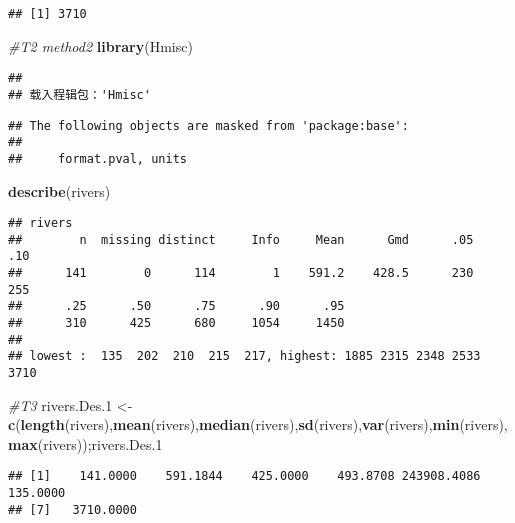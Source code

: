 \documentclass[
]{article}
\newenvironment{Shaded}{\begin{snugshade}}{\end{snugshade}}
\newcommand{\CommentTok}[1]{\textcolor[rgb]{0.56,0.35,0.01}{\textit{#1}}}
\newcommand{\FloatTok}[1]{\textcolor[rgb]{0.00,0.00,0.81}{#1}}
\newcommand{\FunctionTok}[1]{\textcolor[rgb]{0.13,0.29,0.53}{\textbf{#1}}}
\newcommand{\NormalTok}[1]{#1}
\newcommand{\OtherTok}[1]{\textcolor[rgb]{0.56,0.35,0.01}{#1}}
\begin{document}
\begin{verbatim}
## [1] 3710
\end{verbatim}

\begin{Shaded}
\begin{Highlighting}[]
\CommentTok{\#T2 method2}
\FunctionTok{library}\NormalTok{(Hmisc)}
\end{Highlighting}
\end{Shaded}

\begin{verbatim}
## 
## 载入程辑包：'Hmisc'
\end{verbatim}

\begin{verbatim}
## The following objects are masked from 'package:base':
## 
##     format.pval, units
\end{verbatim}

\begin{Shaded}
\begin{Highlighting}[]
\FunctionTok{describe}\NormalTok{(rivers)}
\end{Highlighting}
\end{Shaded}

\begin{verbatim}
## rivers 
##        n  missing distinct     Info     Mean      Gmd      .05      .10 
##      141        0      114        1    591.2    428.5      230      255 
##      .25      .50      .75      .90      .95 
##      310      425      680     1054     1450 
## 
## lowest :  135  202  210  215  217, highest: 1885 2315 2348 2533 3710
\end{verbatim}

\begin{Shaded}
\begin{Highlighting}[]
\CommentTok{\#T3}
\NormalTok{rivers.Des}\FloatTok{.1} \OtherTok{\textless{}{-}} \FunctionTok{c}\NormalTok{(}\FunctionTok{length}\NormalTok{(rivers),}\FunctionTok{mean}\NormalTok{(rivers),}\FunctionTok{median}\NormalTok{(rivers),}\FunctionTok{sd}\NormalTok{(rivers),}\FunctionTok{var}\NormalTok{(rivers),}\FunctionTok{min}\NormalTok{(rivers),}\FunctionTok{max}\NormalTok{(rivers));rivers.Des}\FloatTok{.1}
\end{Highlighting}
\end{Shaded}

\begin{verbatim}
## [1]    141.0000    591.1844    425.0000    493.8708 243908.4086    135.0000
## [7]   3710.0000
\end{verbatim}
\end{document}
